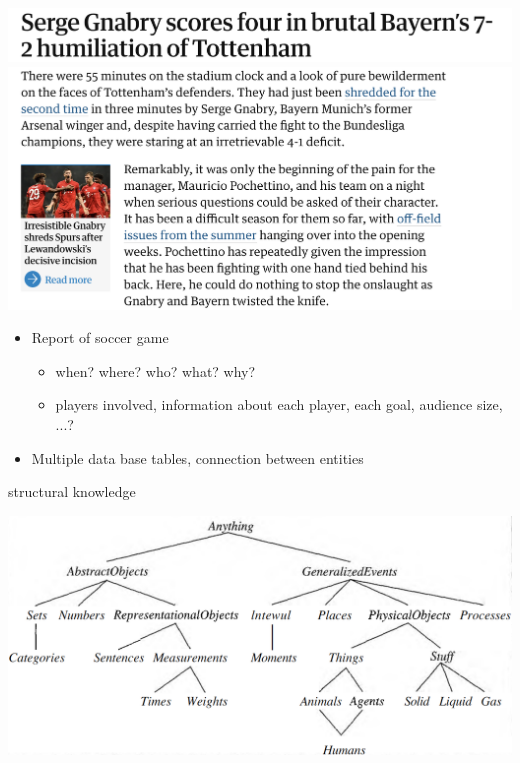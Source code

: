 \documentclass[landscape]{jhuslides3C}
\begin{document}

\vfill
\begin{center}
\includegraphics[scale=0.6]{tottenham-bayern1.png}
\includegraphics[scale=0.6]{tottenham-bayern2.png}
\end{center}
\begin{itemize}
\item Report of soccer game
\begin{itemize}
\item when? where? who? what? why? 
\item players involved, information about each player, each goal, audience size, ...?
\end{itemize}
\item Multiple data base tables, connection between entities
\end{itemize}
\vfill


\slide{}
\vspace{85mm}
\begin{center}
{\huge structural knowledge}
\end{center}


\vfill
\begin{center}
\includegraphics[width=24cm]{ontology.png}
\end{center}
\vfill
\end{document}

